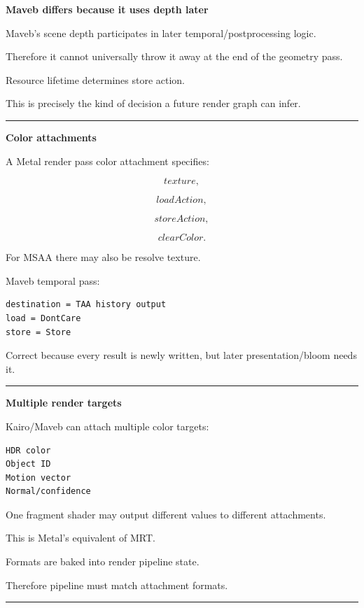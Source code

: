 \textbf{Maveb differs because it uses depth later}

Maveb's scene depth participates in later temporal/postprocessing logic.

Therefore it cannot universally throw it away at the end of the geometry pass.

Resource lifetime determines store action.

This is precisely the kind of decision a future render graph can infer.

\begin{center}\rule{0.5\linewidth}{0.5pt}\end{center}

\textbf{Color attachments}

A Metal render pass color attachment specifies:

\[
texture,
\]

\[
loadAction,
\]

\[
storeAction,
\]

\[
clearColor.
\]

For MSAA there may also be resolve texture.

Maveb temporal pass:

\begin{verbatim}
destination = TAA history output
load = DontCare
store = Store
\end{verbatim}

Correct because every result is newly written, but later presentation/bloom needs it.

\begin{center}\rule{0.5\linewidth}{0.5pt}\end{center}

\textbf{Multiple render targets}

Kairo/Maveb can attach multiple color targets:

\begin{verbatim}
HDR color
Object ID
Motion vector
Normal/confidence
\end{verbatim}

One fragment shader may output different values to different attachments.

This is Metal's equivalent of MRT.

Formats are baked into render pipeline state.

Therefore pipeline must match attachment formats.

\begin{center}\rule{0.5\linewidth}{0.5pt}\end{center}

